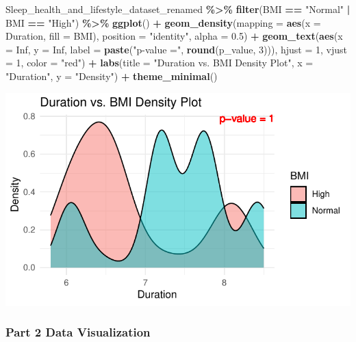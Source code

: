 \documentclass[
  11pt,
]{article}
\newenvironment{Shaded}{\begin{snugshade}}{\end{snugshade}}
\newcommand{\AttributeTok}[1]{\textcolor[rgb]{0.13,0.29,0.53}{#1}}
\newcommand{\ConstantTok}[1]{\textcolor[rgb]{0.56,0.35,0.01}{#1}}
\newcommand{\DecValTok}[1]{\textcolor[rgb]{0.00,0.00,0.81}{#1}}
\newcommand{\FloatTok}[1]{\textcolor[rgb]{0.00,0.00,0.81}{#1}}
\newcommand{\FunctionTok}[1]{\textcolor[rgb]{0.13,0.29,0.53}{\textbf{#1}}}
\newcommand{\NormalTok}[1]{#1}
\newcommand{\SpecialCharTok}[1]{\textcolor[rgb]{0.81,0.36,0.00}{\textbf{#1}}}
\newcommand{\StringTok}[1]{\textcolor[rgb]{0.31,0.60,0.02}{#1}}
\begin{document}
\begin{Shaded}
\begin{Highlighting}[]
\NormalTok{Sleep\_health\_and\_lifestyle\_dataset\_renamed }\SpecialCharTok{\%\textgreater{}\%}
  \FunctionTok{filter}\NormalTok{(BMI }\SpecialCharTok{==} \StringTok{"Normal"} \SpecialCharTok{|}\NormalTok{ BMI }\SpecialCharTok{==} \StringTok{"High"}\NormalTok{) }\SpecialCharTok{\%\textgreater{}\%}
  \FunctionTok{ggplot}\NormalTok{() }\SpecialCharTok{+}
  \FunctionTok{geom\_density}\NormalTok{(}\AttributeTok{mapping =} \FunctionTok{aes}\NormalTok{(}\AttributeTok{x =}\NormalTok{ Duration, }\AttributeTok{fill =}\NormalTok{ BMI), }\AttributeTok{position =} \StringTok{"identity"}\NormalTok{, }\AttributeTok{alpha =} \FloatTok{0.5}\NormalTok{) }\SpecialCharTok{+}
  \FunctionTok{geom\_text}\NormalTok{(}\FunctionTok{aes}\NormalTok{(}\AttributeTok{x =} \ConstantTok{Inf}\NormalTok{, }\AttributeTok{y =} \ConstantTok{Inf}\NormalTok{, }\AttributeTok{label =} \FunctionTok{paste}\NormalTok{(}\StringTok{"p{-}value ="}\NormalTok{, }\FunctionTok{round}\NormalTok{(p\_value, }\DecValTok{3}\NormalTok{))),}
            \AttributeTok{hjust =} \DecValTok{1}\NormalTok{, }\AttributeTok{vjust =} \DecValTok{1}\NormalTok{, }\AttributeTok{color =} \StringTok{"red"}\NormalTok{) }\SpecialCharTok{+}
  \FunctionTok{labs}\NormalTok{(}\AttributeTok{title =} \StringTok{"Duration vs. BMI Density Plot"}\NormalTok{,}
       \AttributeTok{x =} \StringTok{"Duration"}\NormalTok{,}
       \AttributeTok{y =} \StringTok{"Density"}\NormalTok{) }\SpecialCharTok{+}
  \FunctionTok{theme\_minimal}\NormalTok{()}
\end{Highlighting}
\end{Shaded}

\begin{center}\includegraphics[width=0.7\linewidth]{SleepHelath_files/figure-latex/unnamed-chunk-27-1} \end{center}

\hypertarget{part-2-data-visualization}{%
\subsubsection{Part 2 Data
Visualization}\label{part-2-data-visualization}}
\end{document}
